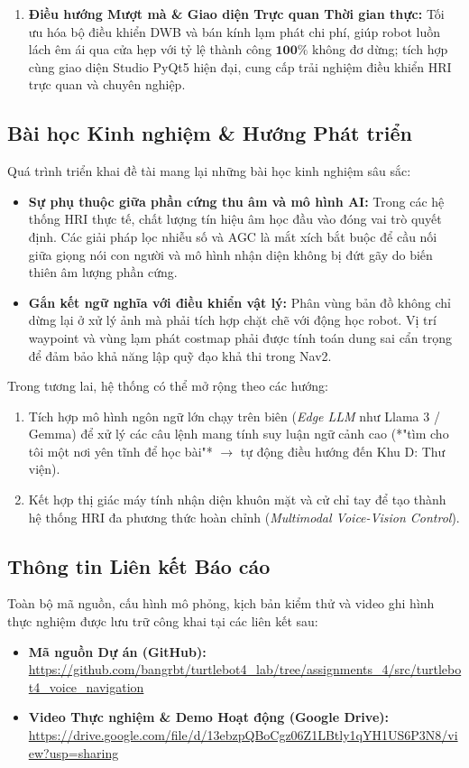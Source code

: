 \begin{enumerate}[label=\textbf{\arabic*.}]
    \item \textbf{Điều hướng Mượt mà & Giao diện Trực quan Thời gian thực:} Tối ưu hóa bộ điều khiển DWB và bán kính lạm phát chi phí, giúp robot luồn lách êm ái qua cửa hẹp với tỷ lệ thành công $\mathbf{100\%}$ không đơ dừng; tích hợp cùng giao diện Studio PyQt5 hiện đại, cung cấp trải nghiệm điều khiển HRI trực quan và chuyên nghiệp.
\end{enumerate}

\subsection{Bài học Kinh nghiệm & Hướng Phát triển}

Quá trình triển khai đề tài mang lại những bài học kinh nghiệm sâu sắc:
\begin{itemize}
    \item \textbf{Sự phụ thuộc giữa phần cứng thu âm và mô hình AI:} Trong các hệ thống HRI thực tế, chất lượng tín hiệu âm học đầu vào đóng vai trò quyết định. Các giải pháp lọc nhiễu số và AGC là mắt xích bắt buộc để cầu nối giữa giọng nói con người và mô hình nhận diện không bị đứt gãy do biến thiên âm lượng phần cứng.
    \item \textbf{Gắn kết ngữ nghĩa với điều khiển vật lý:} Phân vùng bản đồ không chỉ dừng lại ở xử lý ảnh mà phải tích hợp chặt chẽ với động học robot. Vị trí waypoint và vùng lạm phát costmap phải được tính toán dung sai cẩn trọng để đảm bảo khả năng lập quỹ đạo khả thi trong Nav2.
\end{itemize}

Trong tương lai, hệ thống có thể mở rộng theo các hướng:
\begin{enumerate}
    \item Tích hợp mô hình ngôn ngữ lớn chạy trên biên (\textit{Edge LLM} như Llama 3 / Gemma) để xử lý các câu lệnh mang tính suy luận ngữ cảnh cao (*"tìm cho tôi một nơi yên tĩnh để học bài"* $\rightarrow$ tự động điều hướng đến Khu D: Thư viện).
    \item Kết hợp thị giác máy tính nhận diện khuôn mặt và cử chỉ tay để tạo thành hệ thống HRI đa phương thức hoàn chỉnh (\textit{Multimodal Voice-Vision Control}).
\end{enumerate}

\subsection{Thông tin Liên kết Báo cáo}

Toàn bộ mã nguồn, cấu hình mô phỏng, kịch bản kiểm thử và video ghi hình thực nghiệm được lưu trữ công khai tại các liên kết sau:
\begin{itemize}
    \item \textbf{Mã nguồn Dự án (GitHub):} \\
    \url{https://github.com/bangrbt/turtlebot4_lab/tree/assignments_4/src/turtlebot4_voice_navigation}
    \item \textbf{Video Thực nghiệm & Demo Hoạt động (Google Drive):} \\
    \url{https://drive.google.com/file/d/13ebzpQBoCgz06Z1LBtly1qYH1US6P3N8/view?usp=sharing}
\end{itemize}
